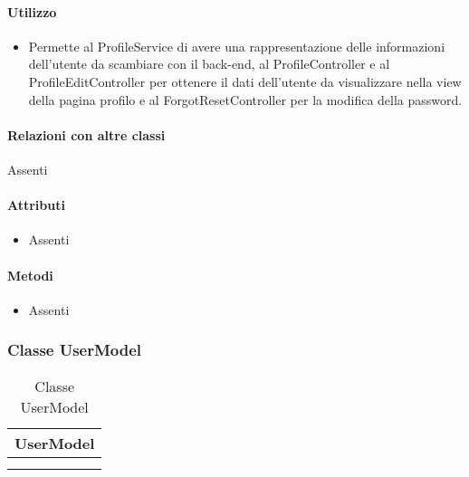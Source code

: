 \paragraph*{Utilizzo}
\begin{itemize}
\item[] Permette al ProfileService di avere una rappresentazione delle informazioni dell'utente da scambiare con il back-end, al ProfileController e al ProfileEditController per ottenere il dati dell'utente da visualizzare nella view della pagina profilo e al ForgotResetController per la modifica della password.
\end{itemize}

\paragraph*{Relazioni con altre classi}
Assenti

\paragraph*{Attributi}
\begin{itemize}
\item[] Assenti
\end{itemize}

\paragraph*{Metodi}
\begin{itemize}
\item[] Assenti
\end{itemize}

\subsubsection{Classe UserModel}

\begin{table}[ht]
\begin{center}
\bgroup
\setlength{\arrayrulewidth}{0.6mm}
\def\arraystretch{1}
\begin{tabular}{ | p{12cm} | }
\hline
\centerline{\textbf{UserModel}}
\\ \hline
 \\ 
\hline
 \\ 
\hline
\end{tabular}
\egroup
\caption{Classe UserModel}
\end{center}
\end{table}

